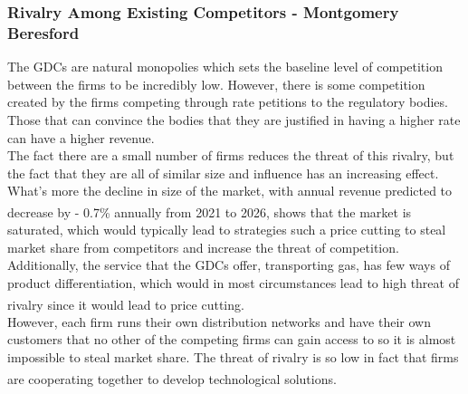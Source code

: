 \documentclass[11pt]{article}		%
\newcommand{\supercite}[1]{\textsuperscript{\cite{#1}}}		%
\newcommand{\sectref}[1]{\hyperref[#1]{Section \ref*{#1}}}     %
\begin{document}
               
          \subsubsection[Rivalry Among Existing Competitors]{Rivalry Among Existing Competitors - Montgomery Beresford}
                The GDCs are natural monopolies which sets the baseline level of competition between the firms to be incredibly low. However,
                there is some competition created by the firms competing through rate petitions to the regulatory bodies. Those that can convince the bodies that they are justified in having a higher rate can have a higher revenue.%
                \\ 
                  \hspace*{2ex}The fact there are a small number of firms reduces the threat of this rivalry, but the fact that they are all of similar size and influence has an increasing effect. What's more the decline in size of the market, with annual revenue predicted to decrease by - 0.7\% annually from 2021 to 2026\supercite{Gas_Distribution_Industry}, shows that the market is saturated, which would typically lead to strategies such a price cutting to steal market share from competitors and increase the threat of competition.
                 Additionally, the service that the GDCs offer, transporting gas, has few ways of product differentiation, which would in most circumstances lead to high threat of rivalry since it would lead to price cutting\supercite{Gas_Distribution_Industry}.
                 \\
                 \hspace*{2ex}However, each firm runs their own distribution networks and have their own customers that no other of the competing firms can gain access to so it is almost impossible to steal market share. The threat of rivalry is so low in fact that firms are cooperating together to develop technological solutions\supercite{SGN-GD2}.
           
                
                
\end{document}

